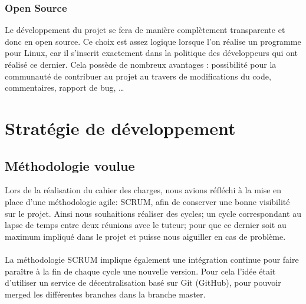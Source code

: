 \documentclass[french]{report}
\begin{document}
\subsection{Open Source}
Le développement du projet se fera de manière complètement transparente et donc
en open source. Ce choix est assez logique lorsque l’on réalise un programme
pour Linux, car il s’inscrit exactement dans la politique des développeurs qui
ont réalisé ce dernier. Cela possède de nombreux avantages : possibilité pour
la communauté de contribuer au projet au travers de modifications du code,
commentaires, rapport de bug, \ldots

\chapter{Stratégie de développement}

\newpage

\section{Méthodologie voulue}
Lors de la réalisation du cahier des charges, nous avions réfléchi à la mise en
place d'une méthodologie agile: SCRUM, afin de conserver une bonne visibilité sur le
projet. Ainsi nous souhaitions réaliser des cycles; un cycle correspondant au
lapse de temps entre deux réunions avec le tuteur; pour que ce dernier soit au
maximum impliqué dans le projet et puisse nous aiguiller en cas de problème.
\\
\\
La méthodologie SCRUM implique également une intégration continue pour faire
paraître à la fin de chaque cycle une nouvelle version. Pour cela l'idée était
d'utiliser un service de décentralisation basé sur Git (GitHub), pour pouvoir merged les
différentes branches dans la branche master.
\end{document}
